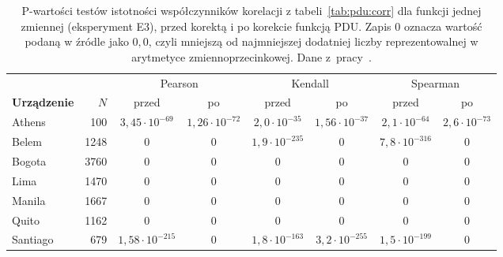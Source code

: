 \begin{table}[htbp]
\centering
\caption[P-wartości współczynników korelacji dla funkcji jednej zmiennej]{P-wartości testów istotności współczynników korelacji z tabeli~\ref{tab:pdu:corr} dla funkcji jednej zmiennej (eksperyment E3), przed korektą i po korekcie funkcją PDU.
Zapis $0$ oznacza wartość podaną w źródle jako $0{,}0$, czyli mniejszą od najmniejszej dodatniej liczby reprezentowalnej w arytmetyce zmiennoprzecinkowej.
Dane z~pracy~\cite{werner_magisterka_2022}.}
\label{tab:pdu:app:pvalues}
\footnotesize
\begin{tabular}{@{}lrcccccc@{}}
\toprule
 & & \multicolumn{2}{c}{Pearson} & \multicolumn{2}{c}{Kendall} & \multicolumn{2}{c}{Spearman} \\
\cmidrule(lr){3-4}\cmidrule(lr){5-6}\cmidrule(l){7-8}
\textbf{Urządzenie} & $N$ & przed & po & przed & po & przed & po \\
\midrule
Athens & 100 & $3{,}45\cdot10^{-69}$ & $1{,}26\cdot10^{-72}$ & $2{,}0\cdot10^{-35}$ & $1{,}56\cdot10^{-37}$ & $2{,}1\cdot10^{-64}$ & $2{,}6\cdot10^{-73}$ \\
Belem & 1248 & $0$ & $0$ & $1{,}9\cdot10^{-235}$ & $0$ & $7{,}8\cdot10^{-316}$ & $0$ \\
Bogota & 3760 & $0$ & $0$ & $0$ & $0$ & $0$ & $0$ \\
Lima & 1470 & $0$ & $0$ & $0$ & $0$ & $0$ & $0$ \\
Manila & 1667 & $0$ & $0$ & $0$ & $0$ & $0$ & $0$ \\
Quito & 1162 & $0$ & $0$ & $0$ & $0$ & $0$ & $0$ \\
Santiago & 679 & $1{,}58\cdot10^{-215}$ & $0$ & $1{,}8\cdot10^{-163}$ & $3{,}2\cdot10^{-255}$ & $1{,}5\cdot10^{-199}$ & $0$ \\
\bottomrule
\end{tabular}
\end{table}

